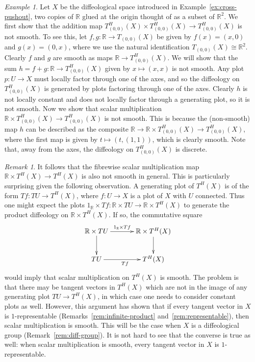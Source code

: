 \documentclass{amsart}
\theoremstyle{remark}
\newtheorem{rem}[de]{Remark}
\newtheorem{ex}[de]{Example}
\newcommand{\ra}{\to}
\def \R{\mathbb{R}}
\begin{document}
\begin{ex}\label{ex:bundleofcross}
Let $X$ be the diffeological space introduced in Example~\ref{ex:cross-pushout},
two copies of $\R$ glued at the origin thought of as a subset of $\R^2$.
We first show that the addition map
$T_{(0,0)}^H(X) \times T_{(0,0)}^H(X) \ra T_{(0,0)}^H(X)$ is not smooth.
To see this, let $f, g: \R \ra T_{(0,0)}(X)$ be given by
$f(x)=(x,0)$ and $g(x)=(0,x)$,
where we use the natural identification $T_{(0,0)}(X) \cong \R^2$.
Clearly $f$ and $g$ are smooth as maps $\R \ra T_{(0,0)}^H(X)$.
We will show that the sum $h = f + g: \R \ra T_{(0,0)}^H(X)$
given by $x \mapsto (x,x)$ is not smooth.
Any plot $p: U \to X$ must locally factor through one of the axes,
and so the diffeology on $T_{(0,0)}^H(X)$ is generated by plots
factoring through one of the axes.
Clearly $h$ is not locally constant and
does not locally factor through a generating plot,
so it is not smooth.
Now we show that scalar multiplication
$\R \times T_{(0,0)}^H(X) \ra T_{(0,0)}^H(X)$ is not smooth.
This is because the (non-smooth) map $h$ can be described as the composite
$\R \ra \R \times T_{(0,0)}^H(X) \ra T_{(0,0)}^H(X)$,
where the first map is given by $t \mapsto (t,(1,1))$, which is clearly smooth.
Note that, away from the axes, the diffeology on $T_{(0,0)}^H(X)$ is discrete.
\end{ex}

\begin{rem}\label{rem:scalar-mult}
It follows that the fibrewise scalar multiplication map $\R \times T^H(X) \to T^H(X)$
is also not smooth in general.
This is particularly surprising given the following observation.
A generating plot of $T^H(X)$ is of the form $Tf : TU \to T^H(X)$,
where $f : U \to X$ is a plot of $X$ with $U$ connected.
Thus one might expect the plots $1_{\R} \times Tf : \R \times TU \to \R \times T^H(X)$
to generate the product diffeology on $\R \times T^H(X)$.
If so, the commutative square
\[
\xymatrix@C+10pt{\R \times TU \ar[r]^-{1_{\R} \times Tf} \ar[d] & \R \times T^H(X) \ar[d] \\
                    TU \ar[r]_{Tf}                   & T^H(X) }
\]
would imply that scalar multiplication on $T^H(X)$ is smooth.
The problem is that there may be tangent vectors in $T^H(X)$ which are
not in the image of any generating plot $TU \to T^H(X)$, in which case
one needs to consider constant plots as well.
However, this argument has shown that if every tangent vector in $X$ is
$1$-representable (Remarks~\ref{rem:infinite-product} and~\ref{rem:representable}),
then scalar multiplication is smooth.
This will be the case when $X$ is a diffeological group (Remark~\ref{rem:diff-group}).
It is not hard to see that the converse is true as well:  when scalar multiplication
is smooth, every tangent vector in $X$ is $1$-representable.
%
%
\end{rem}
\end{document}

